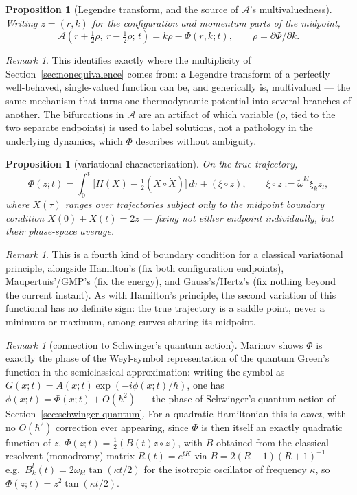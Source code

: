 \documentclass[11pt]{book}
\theoremstyle{definition}
\theoremstyle{plain}
\newtheorem{proposition}[definition]{Proposition}
\theoremstyle{remark}
\newtheorem{remark}[definition]{Remark}
\begin{document}
\begin{proposition}[Legendre transform, and the source of $\mathcal A$'s multivaluedness]
Writing $z=(r,k)$ for the configuration and momentum parts of the midpoint,
\[
\mathcal A\!\left(r+\tfrac12\rho,\ r-\tfrac12\rho;\,t\right) = k\rho - \Phi(r,k;t), \qquad \rho=\partial\Phi/\partial k .
\]
\end{proposition}

\begin{remark}
This identifies exactly where the multiplicity of Section~\ref{sec:nonequivalence} comes from: a Legendre transform of a perfectly well-behaved, single-valued function can be, and generically is, multivalued --- the same mechanism that turns one thermodynamic potential into several branches of another. The bifurcations in $\mathcal A$ are an artifact of which variable ($\rho$, tied to the two separate endpoints) is used to label solutions, not a pathology in the underlying dynamics, which $\Phi$ describes without ambiguity.
\end{remark}

\begin{proposition}[variational characterization]
On the true trajectory,
\[
\Phi(z;t) = \int_0^t\Big[H(X) - \tfrac12(X\circ\dot X)\Big]\,d\tau + (\xi\circ z), \qquad \xi\circ z:=\tilde\omega^{kl}\xi_kz_l,
\]
where $X(\tau)$ ranges over trajectories subject only to the \emph{midpoint} boundary condition $X(0)+X(t)=2z$ --- fixing not either endpoint individually, but their phase-space average.
\end{proposition}

\begin{remark}
This is a fourth kind of boundary condition for a classical variational principle, alongside Hamilton's (fix both configuration endpoints), Maupertuis'/GMP's (fix the energy), and Gauss's/Hertz's (fix nothing beyond the current instant). As with Hamilton's principle, the second variation of this functional has no definite sign: the true trajectory is a saddle point, never a minimum or maximum, among curves sharing its midpoint.
\end{remark}

\begin{remark}[connection to Schwinger's quantum action]
Marinov shows $\Phi$ is exactly the phase of the Weyl-symbol representation of the quantum Green's function in the semiclassical approximation: writing the symbol as $G(x;t)=A(x;t)\exp(-i\phi(x;t)/\hbar)$, one has $\phi(x;t)=\Phi(x;t)+O(\hbar^2)$ --- the phase of Schwinger's quantum action of Section~\ref{sec:schwinger-quantum}. For a quadratic Hamiltonian this is \emph{exact}, with no $O(\hbar^2)$ correction ever appearing, since $\Phi$ is then itself an exactly quadratic function of $z$, $\Phi(z;t)=\tfrac12(B(t)z\circ z)$, with $B$ obtained from the classical resolvent (monodromy) matrix $R(t)=e^{tK}$ via $B=2(R-1)(R+1)^{-1}$ --- e.g.\ $B^l_k(t)=2\omega_{kl}\tan(\kappa t/2)$ for the isotropic oscillator of frequency $\kappa$, so $\Phi(z;t)=z^2\tan(\kappa t/2)$.
\end{remark}
\end{document}
